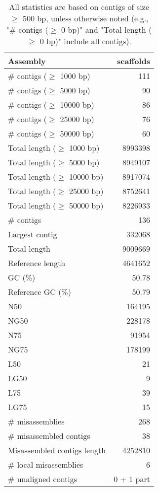 \documentclass[12pt,a4paper]{article}
\begin{document}
\begin{table}[ht]
\begin{center}
\caption{All statistics are based on contigs of size $\geq$ 500 bp, unless otherwise noted (e.g., "\# contigs ($\geq$ 0 bp)" and "Total length ($\geq$ 0 bp)" include all contigs).}
\begin{tabular}{|l*{1}{|r}|}
\hline
Assembly & scaffolds \\ \hline
\# contigs ($\geq$ 1000 bp) & 111 \\ \hline
\# contigs ($\geq$ 5000 bp) & 90 \\ \hline
\# contigs ($\geq$ 10000 bp) & 86 \\ \hline
\# contigs ($\geq$ 25000 bp) & 76 \\ \hline
\# contigs ($\geq$ 50000 bp) & 60 \\ \hline
Total length ($\geq$ 1000 bp) & 8993398 \\ \hline
Total length ($\geq$ 5000 bp) & 8949107 \\ \hline
Total length ($\geq$ 10000 bp) & 8917074 \\ \hline
Total length ($\geq$ 25000 bp) & 8752641 \\ \hline
Total length ($\geq$ 50000 bp) & 8226933 \\ \hline
\# contigs & 136 \\ \hline
Largest contig & 332068 \\ \hline
Total length & 9009669 \\ \hline
Reference length & 4641652 \\ \hline
GC (\%) & 50.78 \\ \hline
Reference GC (\%) & 50.79 \\ \hline
N50 & 164195 \\ \hline
NG50 & 228178 \\ \hline
N75 & 91954 \\ \hline
NG75 & 178199 \\ \hline
L50 & 21 \\ \hline
LG50 & 9 \\ \hline
L75 & 39 \\ \hline
LG75 & 15 \\ \hline
\# misassemblies & 268 \\ \hline
\# misassembled contigs & 38 \\ \hline
Misassembled contigs length & 4252810 \\ \hline
\# local misassemblies & 6 \\ \hline
\# unaligned contigs & 0 + 1 part \\ \hline

\end{tabular}
\end{center}
\end{table}
\end{document}
